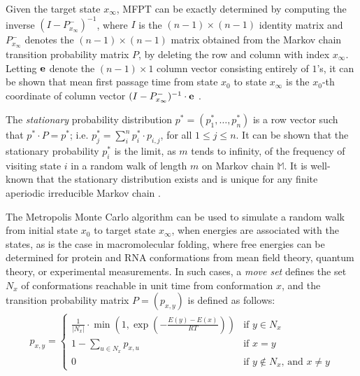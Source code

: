 Given the target state $x_{\infty}$, MFPT can be exactly
determined by computing the inverse
$(I - P^{-}_{x_{\infty}})^{-1}$, where $I$ is the $(n-1)\times (n-1)$ identity
matrix and $P^{-}_{x_{\infty}}$
denotes the $(n-1)\times (n-1)$ matrix obtained from the
Markov chain transition probability matrix $P$,
by deleting the row and column with index $x_{\infty}$.
Letting ${\bf e}$ denote the
$(n-1) \times 1$ column vector consisting entirely of $1$'s, it can be
shown that mean first passage time from state $x_0$ to state $x_{\infty}$
is the $x_0$-th coordinate
of column vector
$(I - P^{-}_{x_{\infty}})^{-1} \cdot {\bf e}$ \cite{meyerMFPT}.


The {\em stationary} probability distribution $p^* = (p^*_1,\ldots,p^*_n)$
is a row vector such that $p^* \cdot P = p^*$; i.e.
$p^*_j = \sum_{i}^n p^*_i \cdot p_{i,j}$, for all $1\leq j \leq n$.
It can be shown that the stationary probability $p^*_i$ is the limit,
as $m$ tends to infinity, of the frequency of visiting state $i$ in a
random walk of length $m$ on Markov chain $\mathbb{M}$.
It is well-known that the stationary distribution exists and is unique
for any finite aperiodic irreducible Markov chain \cite{cloteBackofen:book}.

The Metropolis Monte Carlo algorithm \cite{metropolis:MonteCarlo} can
be used to simulate a random walk from initial state $x_0$ to target state
$x_{\infty}$, when energies are associated with the states, as is the case in
macromolecular folding, where free energies can be determined for
protein and RNA conformations from mean field theory, quantum theory,
or experimental measurements. In such cases, a {\em move set}
defines the set $N_x$ of conformations reachable in unit time
from conformation $x$, and the transition probability matrix
$P = (p_{x,y})$ is defined as follows:
\begin{eqnarray}
\label{eq:transitionProb1}
p_{x,y} = \left\{
\begin{array}{ll}
\frac{1}{|N_x|} \cdot \min\left(1,\exp(-\frac{E(y)-E(x)}{RT})\right)
&\mbox{if $y \in N_x$}\\
1 - \sum_{u \in N_x} p_{x,u} &\mbox{if $x=y$}\\
0 &\mbox{if $y \not\in N_x$, and $x \ne y$}
\end{array} \right.
\end{eqnarray}


